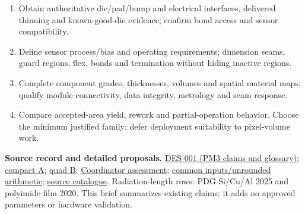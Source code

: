 \documentclass[10pt,a4paper]{article}
\newcommand{\repo}[2]{\href{https://github.com/asalzburger/nodd/blob/design/rd53-pixel-modules/#1}{#2}}
\newcommand{\heading}[1]{\vspace{3pt}{\large\bfseries #1}\par}
\begin{document}
\heading{Priorities before a family recommendation}
\begin{enumerate}
\setlength{\itemsep}{1pt}
\item Obtain authoritative die/pad/bump and electrical interfaces, delivered
thinning and known-good-die evidence; confirm bond access and sensor compatibility.
\item Define sensor process/bias and operating requirements; dimension seams,
guard regions, flex, bonds and termination without hiding inactive regions.
\item Complete component grades, thicknesses, volumes and spatial material
maps; qualify module connectivity, data integrity, metrology and seam response.
\item Compare accepted-area yield, rework and partial-operation behavior.
Choose the minimum justified family; defer deployment suitability to pixel-volume work.
\end{enumerate}

{\small\textbf{Source record and detailed proposals.}
\repo{docs/design/DES-001-rd53-pixel-modules.md}{DES-001 (PM3 claims and glossary)};
\repo{docs/design/inputs/DES-001-compact-modules.md}{compact A};
\repo{docs/design/inputs/DES-001-quad-modules.md}{quad B};
\repo{docs/design/inputs/DES-001-coordinator-review.md}{Coordinator assessment};
\repo{docs/design/DES-001-module-stack.json}{common inputs/unrounded arithmetic};
\repo{reference/manifest.yaml}{source catalogue}.
Radiation-length rows: PDG Si/Cu/Al 2025 and polyimide film 2020.
This brief summarizes existing claims; it adds no approved parameters or hardware validation.}
\end{document}

